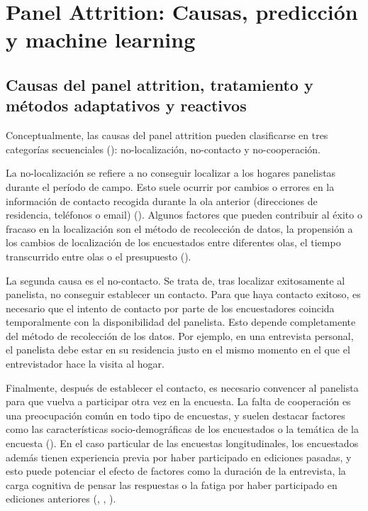 \chapter{Panel Attrition: Causas, predicción y machine learning}
\label{chapter:attrition}
\section{Causas del panel attrition, tratamiento y métodos adaptativos y reactivos}
\label{section:causes_attrition}

Conceptualmente, las causas del panel attrition pueden clasificarse en tres categorías secuenciales (\cite{lepkowski2002nonresponse}): no-localización, no-contacto y no-cooperación.

La no-localización se refiere a no conseguir localizar a los hogares panelistas durante el período de campo. Esto suele ocurrir por cambios o errores en la información de contacto recogida durante la ola anterior (direcciones de residencia, teléfonos o email) (\cite{couper2009keeping}). Algunos factores que pueden contribuir al éxito o fracaso en la localización son el método de recolección de datos, la propensión a los cambios de localización de los encuestados entre diferentes olas, el tiempo transcurrido entre olas o el presupuesto (\cite{lynn2009methods}).

La segunda causa es el no-contacto. Se trata de, tras localizar exitosamente al panelista, no conseguir establecer un contacto. Para que haya contacto exitoso, es necesario que el intento de contacto por parte de los encuestadores coincida temporalmente con la disponibilidad del panelista. Esto depende completamente del método de recolección de los datos. Por ejemplo, en una entrevista personal, el panelista debe estar en su residencia justo en el mismo momento en el que el entrevistador hace la visita al hogar.

Finalmente, después de establecer el contacto, es necesario convencer al panelista para que vuelva a participar otra vez en la encuesta. La falta de cooperación es una preocupación común en todo tipo de encuestas, y suelen destacar factores como las características socio-demográficas de los encuestados o la temática de la encuesta (\cite{groves1992understanding}). En el caso particular de las encuestas longitudinales, los encuestados además tienen experiencia previa por haber participado en ediciones pasadas, y esto puede potenciar el efecto de factores como la duración de la entrevista, la carga cognitiva de pensar las respuestas o la fatiga por haber participado en ediciones anteriores (\cite{laurie1999strategies}, \cite{watson2009identifying}, \cite{lynn2018tackling}).

